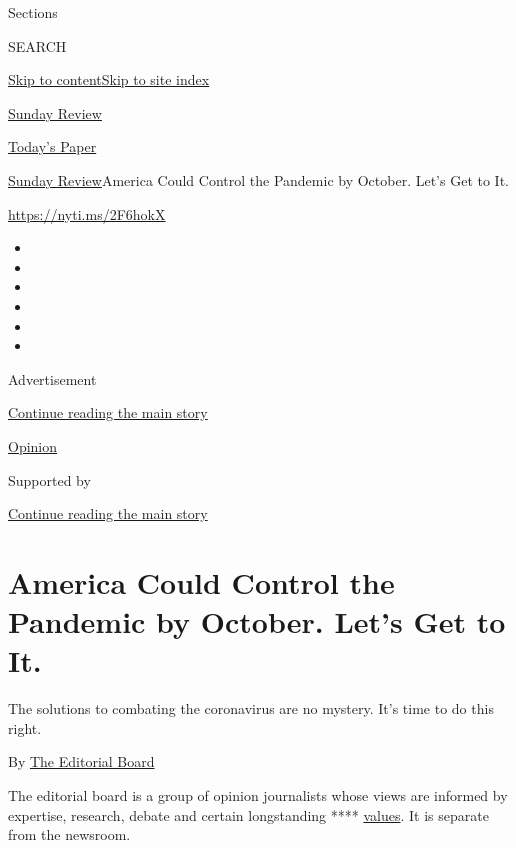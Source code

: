 Sections

SEARCH

\protect\hyperlink{site-content}{Skip to
content}\protect\hyperlink{site-index}{Skip to site index}

\href{https://www.nytimes.com/section/opinion/sunday}{Sunday Review}

\href{https://myaccount.nytimes.com/auth/login?response_type=cookie\&client_id=vi}{}

\href{https://www.nytimes.com/section/todayspaper}{Today's Paper}

\href{/section/opinion/sunday}{Sunday Review}\textbar{}America Could
Control the Pandemic by October. Let's Get to It.

\href{https://nyti.ms/2F6hokX}{https://nyti.ms/2F6hokX}

\begin{itemize}
\item
\item
\item
\item
\item
\item
\end{itemize}

Advertisement

\protect\hyperlink{after-top}{Continue reading the main story}

\href{/section/opinion}{Opinion}

Supported by

\protect\hyperlink{after-sponsor}{Continue reading the main story}

\hypertarget{america-could-control-the-pandemic-by-october-lets-get-to-it}{%
\section{America Could Control the Pandemic by October. Let's Get to
It.}\label{america-could-control-the-pandemic-by-october-lets-get-to-it}}

The solutions to combating the coronavirus are no mystery. It's time to
do this right.

By
\href{https://www.nytimes.com/interactive/opinion/editorialboard.html}{The
Editorial Board}

The editorial board is a group of opinion journalists whose views are
informed by expertise, research, debate and certain longstanding ****
\href{https://www.nytimes.com/interactive/2018/opinion/editorialboard.html}{values}.
It is separate from the newsroom.

